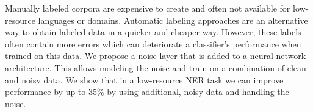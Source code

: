Manually labeled corpora are expensive to create and often not available for low-resource languages or domains. Automatic labeling approaches are an alternative way to obtain labeled data in a quicker and cheaper way. However, these labels often contain more errors which can deteriorate a classifier's performance when trained on this data. We propose a noise layer that is added to a neural network architecture. This allows modeling the noise and train on a combination of clean and noisy data. We show that in a low-resource NER task we can improve performance by up to 35\% by using additional, noisy data and handling the noise.
